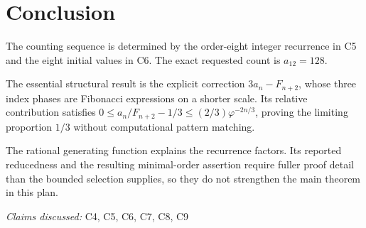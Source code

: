 \documentclass[11pt]{article}
\begin{document}
\section{Conclusion}
The counting sequence is determined by the order-eight integer recurrence in C5 and the eight initial values in C6. The exact requested count is $a_{12}=128$.

The essential structural result is the explicit correction $3a_n-F_{n+2}$, whose three index phases are Fibonacci expressions on a shorter scale. Its relative contribution satisfies $0\leq a_n/F_{n+2}-1/3\leq (2/3)\varphi^{-2n/3}$, proving the limiting proportion $1/3$ without computational pattern matching.

The rational generating function explains the recurrence factors. Its reported reducedness and the resulting minimal-order assertion require fuller proof detail than the bounded selection supplies, so they do not strengthen the main theorem in this plan.

\textit{Claims discussed: }C4, C5, C6, C7, C8, C9
\end{document}
